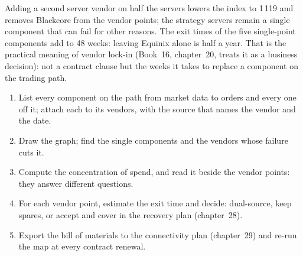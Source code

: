 \begin{omfigure}

\label{fig:nw:the-vendor-map:shares}
\end{omfigure}

Adding a second server vendor on half the servers lowers the index to 1\,119 and removes Blackcore from the vendor points; the strategy
servers remain a single component that can fail for other reasons. The exit times of the five single-point components add to 48 weeks:
leaving Equinix alone is half a year. That is the practical meaning of vendor lock-in (Book~16, chapter~20, treats it as a business
decision): not a contract clause but the weeks it takes to replace a component on the trading path.

\begin{method}\label{met:nw:the-vendor-map:read}
\begin{enumerate}
\item List every component on the path from market data to orders and every one off it; attach each to its vendors, with the source
  that names the vendor and the date.
\item Draw the graph; find the single components and the vendors whose failure cuts it.
\item Compute the concentration of spend, and read it beside the vendor points: they answer different questions.
\item For each vendor point, estimate the exit time and decide: dual-source, keep spares, or accept and cover in the recovery plan
  (chapter~28).
\item Export the bill of materials to the connectivity plan (chapter~29) and re-run the map at every contract renewal.
\end{enumerate}
\end{method}

